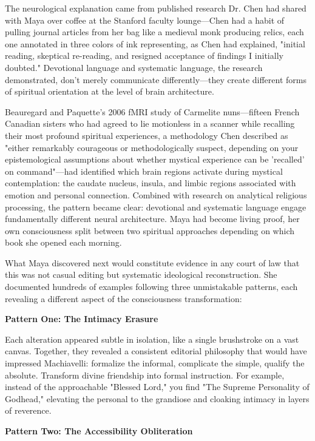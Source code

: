 \documentclass[12pt,twoside]{book}
\begin{document}
The neurological explanation came from published research Dr. Chen had shared with Maya over coffee at the Stanford faculty lounge—Chen had a habit of pulling journal articles from her bag like a medieval monk producing relics, each one annotated in three colors of ink representing, as Chen had explained, "initial reading, skeptical re-reading, and resigned acceptance of findings I initially doubted." Devotional language and systematic language, the research demonstrated, don't merely communicate differently—they create different forms of spiritual orientation at the level of brain architecture.

Beauregard and Paquette's 2006 fMRI study of Carmelite nuns—fifteen French Canadian sisters who had agreed to lie motionless in a scanner while recalling their most profound spiritual experiences, a methodology Chen described as "either remarkably courageous or methodologically suspect, depending on your epistemological assumptions about whether mystical experience can be 'recalled' on command"—had identified which brain regions activate during mystical contemplation: the caudate nucleus, insula, and limbic regions associated with emotion and personal connection. Combined with research on analytical religious processing, the pattern became clear: devotional and systematic language engage fundamentally different neural architecture. Maya had become living proof, her own consciousness split between two spiritual approaches depending on which book she opened each morning.

What Maya discovered next would constitute evidence in any court of law that this was not casual editing but systematic ideological reconstruction. She documented hundreds of examples following three unmistakable patterns, each revealing a different aspect of the consciousness transformation:

\textbf{\textbf{Pattern One: The Intimacy Erasure}}

Each alteration appeared subtle in isolation, like a single brushstroke on a vast canvas. Together, they revealed a consistent editorial philosophy that would have impressed Machiavelli: formalize the informal, complicate the simple, qualify the absolute. Transform divine friendship into formal instruction. For example, instead of the approachable "Blessed Lord," you find "The Supreme Personality of Godhead," elevating the personal to the grandiose and cloaking intimacy in layers of reverence.

\textbf{\textbf{Pattern Two: The Accessibility Obliteration}}
\end{document}
